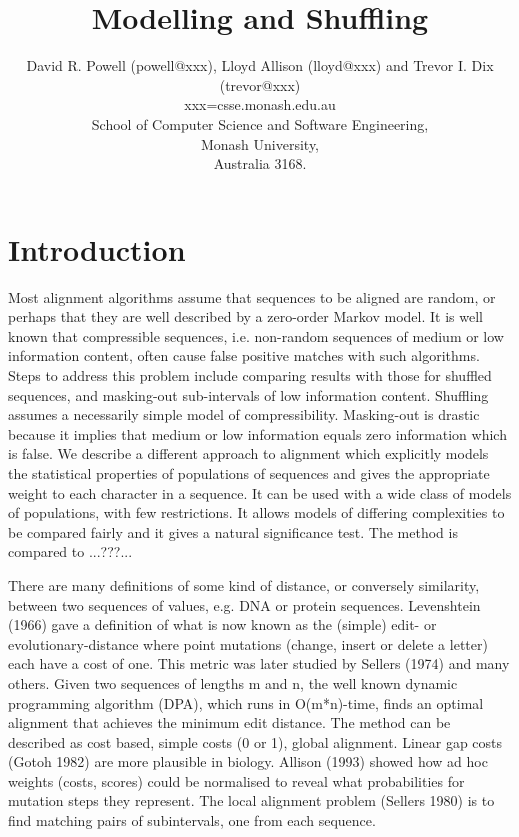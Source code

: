 \documentclass[letterpaper,11pt,oneside]{article}
\begin{document}
\title{Modelling and Shuffling}

\author{
  David R. Powell (powell@xxx), Lloyd Allison (lloyd@xxx) and Trevor I. Dix
(trevor@xxx)\\
{\small xxx=csse.monash.edu.au} \\
  School of Computer Science and Software Engineering, \\
  Monash University, \\
  Australia 3168.
}

\date{}
\maketitle

\section{Introduction}
\label{sec:intro}

Most alignment algorithms assume that sequences to be aligned are random,
or perhaps that they are well described by a zero-order Markov model.
It is well known that compressible sequences,
i.e. non-random sequences of medium or low information content,
often cause false positive matches with such algorithms.
Steps to address this problem include
comparing results with those for shuffled sequences, and
masking-out sub-intervals of low information content.
Shuffling assumes a necessarily simple model of compressibility.
Masking-out is drastic because it implies that
medium or low information equals zero information which is false.
We describe a different approach to alignment which explicitly models
the statistical properties of populations of sequences and
gives the appropriate weight to each character in a sequence.
It can be used with a wide class of models of populations,
with few restrictions.
It allows models of differing complexities to be compared fairly and
it gives a natural significance test.
The method is compared to ...???...

There are many definitions of some kind
of distance, or conversely similarity, between two
sequences of values, e.g. DNA or protein sequences.
Levenshtein (1966) gave a definition of what is now known as the
(simple) edit- or evolutionary-distance where point mutations
(change, insert or delete a letter) each have a cost of one.
This metric was later studied by Sellers (1974) and many others.
Given two sequences of lengths m and n,
the well known dynamic programming algorithm (DPA), which runs in O(m*n)-time,
finds an optimal alignment that achieves the minimum edit distance.
The method can be described as cost based, simple costs (0 or 1),
global alignment.
Linear gap costs (Gotoh 1982) are more plausible in biology.
Allison (1993) showed how ad hoc weights (costs, scores) could be normalised
to reveal what probabilities for mutation steps they represent.
The local alignment problem (Sellers 1980) is to find
matching pairs of subintervals, one from each sequence.
\end{document}

